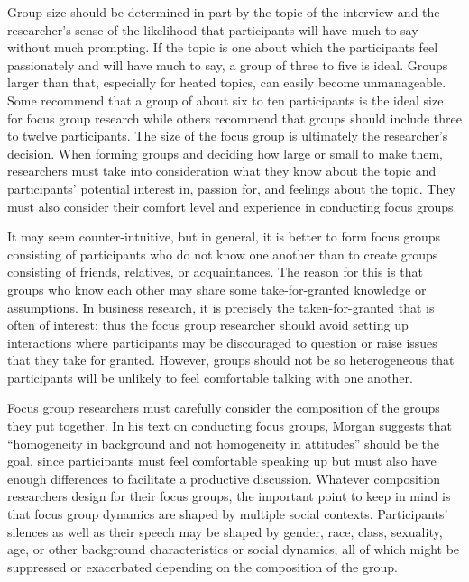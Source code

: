 Group size should be determined in part by the topic of the interview and the researcher's sense of the likelihood that participants will have much to say without much prompting. If the topic is one about which the participants feel passionately and will have much to say, a group of three to five is ideal. Groups larger than that, especially for heated topics, can easily become unmanageable. Some recommend that a group of about six to ten participants is the ideal size for focus group research while others recommend that groups should include three to twelve participants. The size of the focus group is ultimately the researcher's decision. When forming groups and deciding how large or small to make them, researchers must take into consideration what they know about the topic and participants' potential interest in, passion for, and feelings about the topic. They must also consider their comfort level and experience in conducting focus groups. 

It may seem counter-intuitive, but in general, it is better to form focus groups consisting of participants who do not know one another than to create groups consisting of friends, relatives, or acquaintances. The reason for this is that groups who know each other may share some take-for-granted knowledge or assumptions. In business research, it is precisely the taken-for-granted that is often of interest; thus the focus group researcher should avoid setting up interactions where participants may be discouraged to question or raise issues that they take for granted. However, groups should not be so heterogeneous that participants will be unlikely to feel comfortable talking with one another.

Focus group researchers must carefully consider the composition of the groups they put together. In his text on conducting focus groups, Morgan \cite{morgan1996focus} suggests that ``homogeneity in background and not homogeneity in attitudes'' should be the goal, since participants must feel comfortable speaking up but must also have enough differences to facilitate a productive discussion. Whatever composition researchers design for their focus groups, the important point to keep in mind is that focus group dynamics are shaped by multiple social contexts. Participants' silences as well as their speech may be shaped by gender, race, class, sexuality, age, or other background characteristics or social dynamics, all of which might be suppressed or exacerbated depending on the composition of the group.

